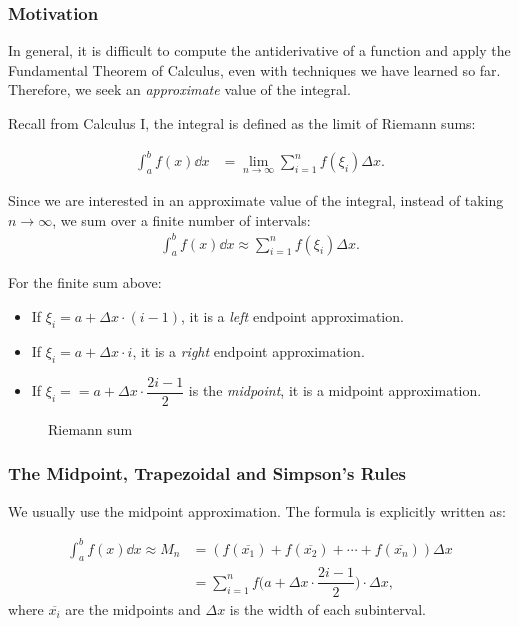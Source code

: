 \subsubsection{Motivation}
In general, it is difficult to compute the antiderivative of a function and apply the Fundamental Theorem of Calculus, even with techniques we have learned so far. Therefore, we seek an \textit{approximate} value of the integral.

Recall from Calculus I, the integral is defined as the limit of Riemann sums:
\begin{defn}
\begin{align*}
    \int_a^b f(x) \dd x &= \lim_{n \to \infty} \sum_{i=1}^n f(\xi_i) \Delta x.
\end{align*}
\end{defn}

Since we are interested in an approximate value of the integral, instead of taking $n \to \infty$, we sum over a finite number of intervals:
\begin{align*}
    \int_a^b f(x) \dd x \approx \sum_{i=1}^n f(\xi_i) \Delta x.
\end{align*}

For the finite sum above:
\begin{itemize}
    \item If $\xi_i = a + \Delta x \cdot (i-1)$, it is a \textit{left} endpoint approximation.
    \item If $\xi_i = a + \Delta x \cdot i$, it is a \textit{right} endpoint approximation.
    \item If $\xi_i = = a + \Delta x \cdot \dfrac{2i-1}{2}$ is the \textit{midpoint}, it is a midpoint approximation.
\end{itemize}

\begin{figure}[H]
    \centering
    \resizebox{0.5\textwidth}{!}{} %
    \caption{Riemann sum}
    \label{fig:Riemann sum}
\end{figure}


\subsubsection{The Midpoint, Trapezoidal and Simpson's Rules}
We usually use the midpoint approximation. The formula is explicitly written as:
\begin{tcolorbox}[colframe=shinbashi!90, colback=shinbashi!5]
\begin{thm}
    \begin{align*}
        \int_a^b f(x) \dd x \approx M_n  &= \left(f(\overline{x_1}) + f(\overline{x_2}) + \cdots + f(\overline{x_n})\right) \Delta x \\
        &= \sum_{i=1}^n f\Big(a + \Delta x \cdot \dfrac{2i-1}{2}\Big) \cdot \Delta x,
    \end{align*}
where $\overline{x_i}$ are the midpoints and $\Delta x$ is the width of each subinterval.
\end{thm}
\end{tcolorbox}


